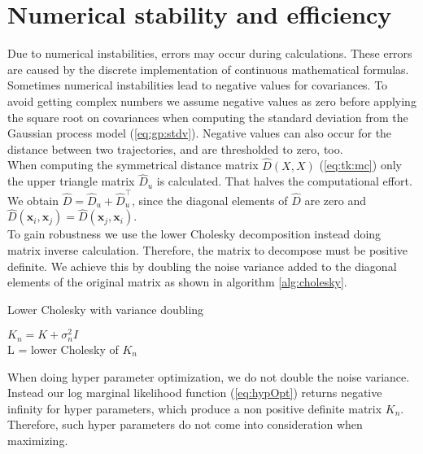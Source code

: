 \section{Numerical stability and efficiency}
Due to numerical instabilities, errors may occur during calculations. These errors are caused by the discrete implementation of continuous mathematical formulas. Sometimes numerical instabilities lead to negative values for covariances. To avoid getting complex numbers we assume negative values as zero before applying the square root on covariances when computing the standard deviation from the Gaussian process model (\ref{eq:gp:stdv}). Negative values can also occur for the distance between two trajectories, and are thresholded to zero, too.\\

When computing the symmetrical distance matrix $\hat{D}(X,X)$ (\ref{eq:tk:mc}) only the upper triangle matrix $\hat{D}_{u}$ is calculated. That halves the computational effort. We obtain $\hat{D} = \hat{D}_{u}+\hat{D}_{u}^\top$, since the diagonal elements of $\hat{D}$ are zero and $\hat{D}(\mathbf{x}_i,\mathbf{x}_j) = \hat{D}(\mathbf{x}_j,\mathbf{x}_i)$.\\

To gain robustness we use the lower Cholesky decomposition instead doing matrix inverse calculation. Therefore, the matrix to decompose must be positive definite. We achieve this by doubling the noise variance added to the diagonal elements of the original matrix as shown in algorithm \ref{alg:cholesky}.

\begin{algorithm}
    \caption{Lower Cholesky with variance doubling\label{alg:cholesky}}
    \BlankLine
    $K_n = K+\sigma_n^2 I$\\
    L = lower Cholesky of $K_n$\\
\end{algorithm}

When doing hyper parameter optimization, we do not double the noise variance. Instead our log marginal likelihood function (\ref{eq:hypOpt}) returns negative infinity for hyper parameters, which produce a non positive definite matrix $K_n$. Therefore, such hyper parameters do not come into consideration when maximizing.

